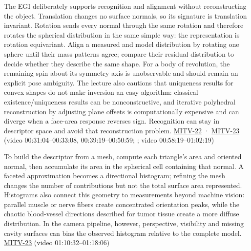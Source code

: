 \hypertarget{04-visual-computing-ii-ch032-from-directional-masses-to-matching-and-sampling}{}

The EGI deliberately supports recognition and alignment without reconstructing the object. Translation changes no surface normals, so its signature is translation invariant. Rotation sends every normal through the same rotation and therefore rotates the spherical distribution in the same simple way: the representation is rotation equivariant. Align a measured and model distribution by rotating one sphere until their mass patterns agree; compare their residual distribution to decide whether they describe the same shape. For a body of revolution, the remaining spin about its symmetry axis is unobservable and should remain an explicit pose ambiguity. The lecture also cautions that uniqueness results for convex shapes do not make inversion an easy algorithm: classical existence/uniqueness results can be nonconstructive, and iterative polyhedral reconstruction by adjusting plane offsets is computationally expensive and can diverge when a face-area response reverses sign. Recognition can stay in descriptor space and avoid that reconstruction problem. \hyperref[04-visual-computing-ii-ch036-mitv-22---exterior-orientation-recovering-position-orientation-bundle-adjustment-object-shape]{MITV-22} · \hyperref[04-visual-computing-ii-ch036-mitv-23---gaussian-image-solids-of-revolution-direction-histograms-regular-polyhedra]{MITV-23} (video 00:31:04--00:33:08, 00:39:19--00:50:59; ; video 00:58:19--01:02:19)

To build the descriptor from a mesh, compute each triangle's area and oriented normal, then accumulate its area in the spherical cell containing that normal. A faceted approximation becomes a directional histogram; refining the mesh changes the number of contributions but not the total surface area represented. Histograms also connect this geometry to measurements beyond machine vision: parallel muscle or nerve fibers create concentrated orientation peaks, while the chaotic blood-vessel directions described for tumor tissue create a more diffuse distribution. In the camera pipeline, however, perspective, visibility and missing cavity surfaces can bias the observed histogram relative to the complete model. \hyperref[04-visual-computing-ii-ch036-mitv-23---gaussian-image-solids-of-revolution-direction-histograms-regular-polyhedra]{MITV-23} (video 01:10:32--01:18:06)

